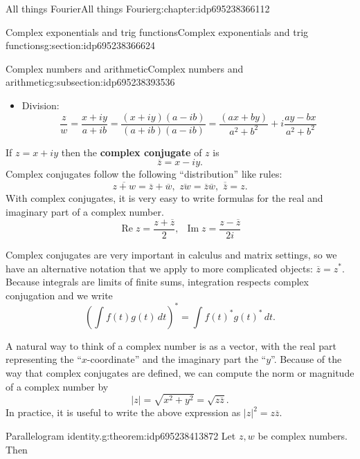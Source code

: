 \documentclass[oneside,10pt,]{book}
\newcommand{\terminology}[1]{\textbf{#1}}
\numberwithin{equation}{section}
\DeclareMathOperator{\RE}{Re}
\DeclareMathOperator{\IM}{Im}
\newcommand{\cc}[1]{\overline{#1}}
\newcommand{\abs}[1]{\left\vert#1\right\vert}
\newcommand{\ad}{^\ast}
\numberwithin{equation}{section}
\begin{document}
\begin{chapterptx}{All things Fourier}{}{All things Fourier}{}{}{g:chapter:idp695238366112}
\begin{sectionptx}{Complex exponentials and trig functions}{}{Complex exponentials and trig functions}{}{}{g:section:idp695238366624}
\begin{subsectionptx}{Complex numbers and arithmetic}{}{Complex numbers and arithmetic}{}{}{g:subsection:idp695238393536}
\begin{itemize}[label=\textbullet]
\begin{equation*}
zw = (a + ib)(x + iy) = (ax - by) + i(bx + ay)
\end{equation*}
%
\item{}Division:%
\begin{equation*}
\frac{z}{w} = \frac{x + iy}{a + ib} = \frac{(x + iy)(a - ib)}{(a + ib)(a - ib)} = \frac{(ax + by)}{a^2 + b^2} + i \frac{ay - bx}{a^2 + b^2}
\end{equation*}
%
\end{itemize}
%
\par
If \(z = x + iy\) then the \terminology{complex conjugate} of \(z\) is%
\begin{equation*}
\cc{z} = x - iy.
\end{equation*}
Complex conjugates follow the following ``distribution'' like rules:%
\begin{equation*}
\cc{z + w} = \cc{z} + \cc{w}, \,\, \cc{zw} = \cc{z} \cc{w}, \,\, \cc{\cc{z}} =z.
\end{equation*}
With complex conjugates, it is very easy to write formulas for the real and imaginary part of a complex number.%
\begin{equation*}
\RE z = \frac{z + \cc{z}}{2}, \,\,\, \IM z = \frac{z - \cc{z}}{2i}
\end{equation*}
%
\par
Complex conjugates are very important in calculus and matrix settings, so we have an alternative notation that we apply to more complicated objects: \(\cc{z} = z\ad\). Because integrals are limits of finite sums, integration respects complex conjugation and we write%
\begin{equation*}
\left(\int f(t)g(t) \, dt \right)\ad = \int f(t)\ad g(t)\ad \, dt.
\end{equation*}
%
\par
A natural way to think of a complex number is as a vector, with the real part representing the ``\(x\)-coordinate'' and the imaginary part the ``\(y\)''. Because of the way that complex conjugates are defined, we can compute the norm or magnitude of a complex number by%
\begin{equation*}
\abs{z} = \sqrt{x^2 + y^2} = \sqrt{z \cc{z}}.
\end{equation*}
In practice, it is useful to write the above expression as \(\abs{z}^2 = z \cc{z}\).%
\begin{theorem}{Parallelogram identity.}{}{g:theorem:idp695238413872}%
Let \(z, w\) be complex numbers. Then%
\begin{equation*}

\end{equation*}
\end{theorem}
\end{subsectionptx}
\end{sectionptx}
\end{chapterptx}
\end{document}
